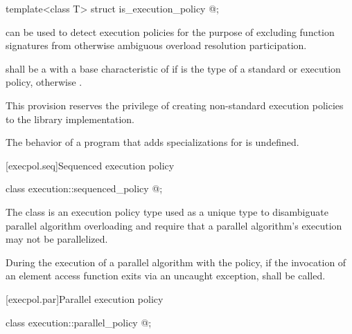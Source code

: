 %
\begin{itemdecl}
template<class T> struct is_execution_policy { @\seebelow@ };
\end{itemdecl}

\begin{itemdescr}
\pnum
{} can be used to detect execution policies for the
purpose of excluding function signatures from otherwise ambiguous overload
resolution participation.

\pnum
{} shall be a  with a
base characteristic of  if  is the type of a standard
or 
execution policy, otherwise .

\begin{note}
This provision reserves the privilege of creating non-standard execution
policies to the library implementation.
\end{note}

\pnum
The behavior of a program that adds specializations for
 is undefined.
\end{itemdescr}

[execpol.seq]{Sequenced execution policy}

%
\begin{itemdecl}
class execution::sequenced_policy { @\unspec@ };
\end{itemdecl}

\begin{itemdescr}
\pnum
The class  is an execution policy type used
as a unique type to disambiguate parallel algorithm overloading and require
that a parallel algorithm's execution may not be parallelized.

\pnum
During the execution of a parallel algorithm with
the  policy,
if the invocation of an element access function exits via an uncaught exception,
 shall be called.
\end{itemdescr}

[execpol.par]{Parallel execution policy}

%
\begin{itemdecl}
class execution::parallel_policy { @\unspec@ };
\end{itemdecl}

